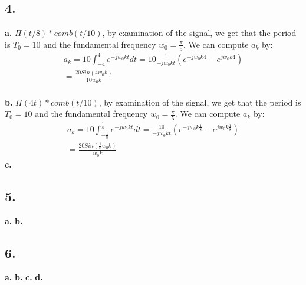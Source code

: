 \documentclass[11pt]{article}
\begin{document}
\subsection*{4.}
\textbf{a.}
$\Pi(t / 8) * comb(t / 10)$, by examination of the signal, we get that the period is $T_0  = 10$ and the fundamental frequency 
$\boxed{w_0 = \frac{\pi}{5}}$. We can compute $a_k$ by:
\begin{align*}
a_k =10\int_{-4}^{4} e^{-jw_0 k t} dt  = 
10 \frac{1}{-jw_0kt} \left(  e^{-jw_0k4}- e^{jw_0k4}\right)\\
= \boxed{ \frac{20Sin(4w_0 k)}{10 w_0 k}  } 
\end{align*}
\\ 
\textbf{b.}
$\Pi(4t) * comb(t / 10)$, by examination of the signal, we get that the period is $T_0  = 10$ and the fundamental frequency 
$\boxed{w_0 = \frac{\pi}{5}}$. We can compute $a_k$ by:
\begin{align*}
a_k = 10 \int_{-\frac{1}{8}}^{\frac{1}{8}} e^{-jw_0 k t} dt  = 
\frac{10}{-jw_0kt } \left(  e^{-jw_0k\frac{1}{8}}- e^{jw_0k\frac{1}{8}}\right)\\
= \boxed{ \frac{20Sin(\frac{1}{8}w_0 k)}{w_0 k}  } 
\end{align*}
\textbf{c.}
\subsection*{5.}
\textbf{a.}
\textbf{b.}
\subsection*{6.}
\textbf{a.}
\textbf{b.}
\textbf{c.}
\textbf{d.}
\end{document}
